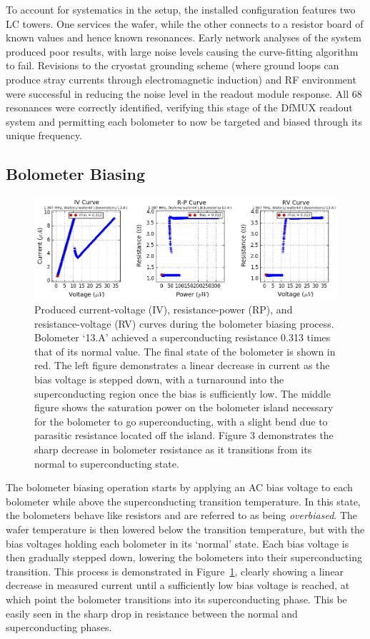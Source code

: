 \documentclass[iop]{emulateapj}
\begin{document}
To account for systematics in the setup, the installed configuration features two LC towers.  One services the wafer, while the other connects to a resistor board of known values and hence known resonances.  Early network analyses of the system produced poor results, with large noise levels causing the curve-fitting algorithm to fail.  Revisions to the cryostat grounding scheme (where ground loops can produce stray currents through electromagnetic induction) and RF environment were successful in reducing the noise level in the readout module response.  All 68 resonances were correctly identified, verifying this stage of the DfMUX readout system and permitting each bolometer to now be targeted and biased through its unique frequency.

\subsection{Bolometer Biasing}

\begin{figure}
	\includegraphics[width=\textwidth]{bolometer_bias}
	\centering
	\caption{Produced current-voltage (IV), resistance-power (RP), and resistance-voltage (RV) curves during the bolometer biasing process.  Bolometer `13.A' achieved a superconducting resistance 0.313 times that of its normal value.  The final state of the bolometer is shown in red.  The left figure demonstrates a linear decrease in current as the bias voltage is stepped down, with a turnaround into the superconducting region once the bias is sufficiently low.  The middle figure shows the saturation power on the bolometer island necessary for the bolometer to go superconducting, with a slight bend due to parasitic resistance located off the island.  Figure 3 demonstrates the sharp decrease in bolometer resistance as it transitions from its normal to superconducting state.}
	\label{bias}
\end{figure}

The bolometer biasing operation starts by applying an AC bias voltage to each bolometer while above the superconducting transition temperature.  In this state, the bolometers behave like resistors and are referred to as being \textit{overbiased}.  The wafer temperature is then lowered below the transition temperature, but with the bias voltages holding each bolometer in its `normal' state.  Each bias voltage is then gradually stepped down, lowering the bolometers into their superconducting transition.  This process is demonstrated in Figure~\ref{bias}, clearly showing a linear decrease in measured current until a sufficiently low bias voltage is reached, at which point the bolometer transitions into its superconducting phase.  This be easily seen in the sharp drop in resistance between the normal and superconducting phases.
\end{document}
